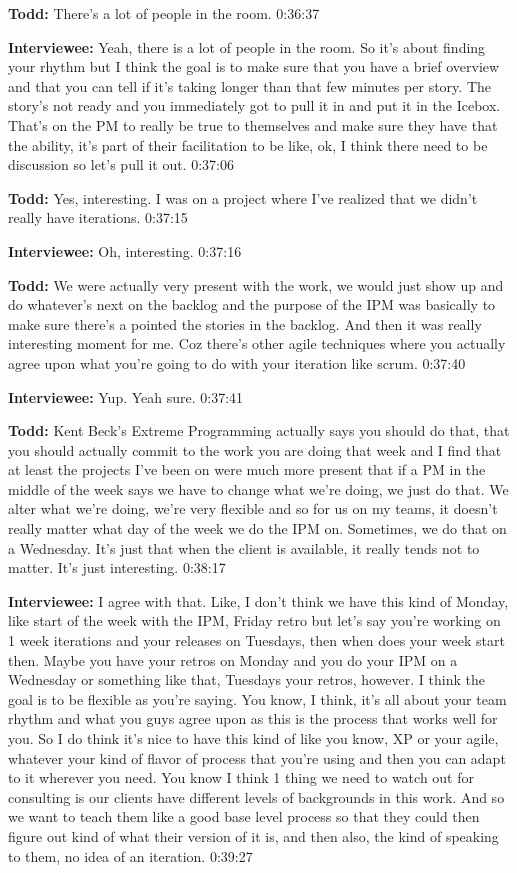 \textbf{Todd:} There's a lot of people in the room.   0:36:37

\textbf{Interviewee:} Yeah, there is a lot of people in the room.  So it's about finding your rhythm but I think the goal is to make sure that you have a brief overview and that you can tell if it's taking longer than that few minutes per story.  The story's not ready and you immediately got to pull it in and put it in the Icebox.  That's on the PM to really be true to themselves and make sure they have that the ability, it's part of their facilitation to be like, ok, I think there need to be discussion so let's pull it out.   0:37:06

\textbf{Todd:} Yes, interesting. I was on a project where I've realized that we didn't really have iterations.   0:37:15

\textbf{Interviewee:} Oh, interesting.   0:37:16

\textbf{Todd:} We were actually very present with the work, we would just show up and do whatever's next on the backlog and the purpose of the IPM was basically to make sure there's a pointed the stories in the backlog.  And then it was really interesting moment for me.  Coz there's other agile techniques where you actually agree upon what you're going to do with your iteration like scrum.   0:37:40

\textbf{Interviewee:} Yup.  Yeah sure.   0:37:41

\textbf{Todd:} Kent Beck's Extreme Programming actually says you should do that, that you should actually commit to the work you are doing that week and I find that at least the projects I've been on were much more present that if a PM in the middle of the week says we have to change what we're doing, we just do that.  We alter what we're doing, we're very flexible and so for us on my teams, it doesn't really matter what day of the week we do the IPM on.  Sometimes, we do that on a Wednesday.  It's just that when the client is available, it really tends not to matter. It's just interesting.   0:38:17

\textbf{Interviewee:} I agree with that.  Like, I don't think we have this kind of Monday, like start of the week with the IPM, Friday retro but let's say you're working on 1 week iterations and your releases on Tuesdays, then when does your week start then.  Maybe you have your retros on Monday and you do your IPM on a Wednesday or something like that, Tuesdays your retros, however.  I think the goal is to be flexible as you're saying. You know, I think, it's all about your team rhythm and what you guys agree upon as this is the process that works well for you.  So I do think it's nice to have this kind of like you know, XP or your agile, whatever your kind of flavor of process that you're using and then you can adapt to it wherever you need.  You know I think 1 thing we need to watch out for consulting is our clients have different levels of backgrounds in this work.  And so we want to teach them like a good base level process so that they could then figure out kind of what their version of it is, and then also, the kind of speaking to them, no idea of an iteration.   0:39:27

